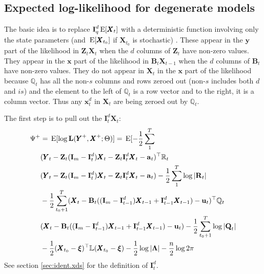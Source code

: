 \documentclass[]{article}
\def\xixi{\mbox{\boldmath $\xi$}}
\def\LAM{\mbox{\boldmath $\Lambda$}}
\def\LAMm{\mathbb{L}}
\def\UPS{\mbox{\boldmath $\Upsilon$}}
\def\XI{\mbox{\boldmath $\Xi$}}
\def\BB{\mbox{$\mathbf B$}}	\def\bb{\mbox{$\mathbf b$}} \def\Bb{\mbox{$\mathbf J$}} \def\Ba{\mbox{$\mathbf L$}} \def\Bm{\UPS}
\def\E{\,\textup{\textrm{E}}}
\def\II{\mbox{$\mathbf I$}} \def\ii{\mbox{$\mathbf i$}}
\def\LL{\mbox{$\mathbf L$}}	\def\ll{\mbox{$\mathbf l$}}
\def\QQ{\mbox{$\mathbf Q$}}	 \def\qq{\mbox{$\mathbf q$}} \def\Qb{\mbox{$\mathbf G$}}  \def\Qm{\mathbb{Q}}
\def\RR{\mbox{$\mathbf R$}}	 \def\rr{\mbox{$\mathbf r$}} \def\Rb{\mbox{$\mathbf H$}}	\def\Rm{\mathbb{R}}
\def\XX{\mbox{$\pmb{X}$}}	\def\xx{\mbox{$\pmb{x}$}}
\def\YY{\mbox{$\pmb{Y}$}}	\def\yy{\mbox{$\pmb{y}$}}
\def\ZZ{\mbox{$\mathbf Z$}}	\def\zz{\mbox{$\mathbf z$}}	\def\Zb{\mbox{$\mathbf M$}} \def\Za{\mbox{$\mathbf N$}} \def\Zm{\XI}
\begin{document}
\subsection{Expected log-likelihood for degenerate models}

The basic idea is to replace $\II_q^d\E[\XX_t]$ with a deterministic function involving only  the state parameters (and $\E[\XX_{t_0}]$ if $\XX_{t_0}$ is stochastic) . These appear in the $\yy$ part of the likelihood in $\ZZ_t\XX_t$ when the $d$ columns of $\ZZ_t$ have non-zero values.  They appear in the $\xx$ part of the likelihood in $\BB_t\XX_{t-1}$ when the $d$ columns of $\BB_t$ have non-zero values.  They do not appear in $\XX_t$ in the $\xx$ part of the likelihood because $\Qm_t$ has all the non-$s$ columns and rows zeroed out (non-$s$ includes both $d$ and $is$) and the element to the left of $\Qm_t$ is a row vector and to the right, it is a column vector.  Thus any $\xx_t^d$ in $\XX_t$ are being zeroed out by $\Qm_t$.

The first step is to pull out the $\II_t^{d}\XX_t$:
\begin{equation}
\begin{split}
\Psi^+ &= \E[\log\LL(\YY^+,\XX^+ ; \Theta)] = \E[-\frac{1}{2}\sum_1^T \\
& (\YY_t - \ZZ_t(\II_m-\II_t^d)\XX_t - \ZZ_t\II_t^d\XX_t - \aa_t)^\top \Rm_t\\ 
&(\YY_t - \ZZ_t(\II_m-\II_t^d)\XX_t - \ZZ_t\II_t^d\XX_t - \aa_t) -\frac{1}{2}\sum_1^T\log |\RR_t|\\
& -\frac{1}{2}\sum_{t_0+1}^T (\XX_t - \BB_t ((\II_m - \II_{t-1}^d)\XX_{t-1} + \II_{t-1}^d\XX_{t-1}) - \uu_t)^\top \Qm_t \\
&(\XX_t - \BB_t ((\II_m - \II_{t-1}^d)\XX_{t-1} + \II_{t-1}^d\XX_{t-1}) - \uu_t) - \frac{1}{2}\sum_{t_0+1}^T\log |\QQ_t| \\
&  - \frac{1}{2}(\XX_{t_0} - \xixi)^\top \LAMm(\XX_{t_0} - \xixi) - \frac{1}{2}\log |\LAM| -\frac{n}{2}\log 2\pi 
\end{split}
\end{equation}
See section \ref{sec:ident.xds} for the definition of  $\II_t^d$.
\end{document}
